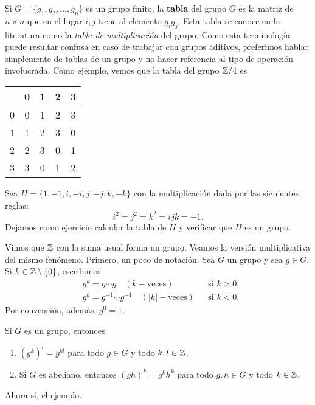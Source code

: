 Si $G=\{g_1,g_2,\dots,g_n\}$ es un grupo finito, la \textbf{tabla}  
del grupo $G$ es la matriz de $n\times n$ que en el lugar 
$i,j$ tiene al elemento $g_ig_j$. Esta tabla se conoce en la literatura como la \emph{tabla de multiplicación} del grupo. 
Como esta terminología puede resultar confusa en caso de trabajar con grupos aditivos, preferimos hablar simplemente
de tablas de un grupo y no hacer referencia al tipo de operación involucrada. Como ejemplo, 
vemos que la tabla del grupo
$\mathbb{Z}/4$ es
\begin{center}
  \begin{tabular}{l|cccc}
     &0&1&2&3 \\
    \hline
    0 & 0 & 1 & 2 & 3\\
    1 & 1 & 2 & 3 & 0\\
    2 & 2 & 3 & 0 & 1\\
    3 & 3 & 0 & 1 & 2
  \end{tabular}
\end{center}

\begin{example}
Sea $H=\{1,-1,i,-i,j,-j,k,-k\}$ con la multiplicación dada por las siguientes reglas:
\[
i^2=j^2=k^2=ijk=-1.
\]
Dejamos como ejercicio calcular la tabla de $H$ y verificar que $H$ es un grupo. 
\end{example}

Vimos que $\mathbb{Z}$ con la suma usual forma un grupo. 
Veamos la versión multiplicativa del mismo fenómeno.  
Primero, un poco de notación. 
Sea $G$ un grupo y sea $g\in G$. Si $k\in\mathbb{Z}\setminus\{0\}$, escribimos 
\begin{align*}
		& g^k=g\cdots g\quad (k-\text{veces}) && \text{si $k>0$},\\
		& g^k=g^{-1}\cdots g^{-1}\quad (|k|-\text{veces}) && \text{si $k<0$}.
\end{align*}
Por convención, además, $g^0=1$. 

\begin{exercise}
	Si $G$ es un grupo, entonces
	\begin{enumerate}
		\item $(g^k)^l=g^{kl}$ para todo $g\in G$ y todo $k,l\in\mathbb{Z}$. 
		\item Si $G$ es abeliano, entonces $(gh)^k=g^kh^k$ para todo $g,h\in G$
			y todo $k\in\mathbb{Z}$. 
	\end{enumerate}
\end{exercise}

Ahora sí, el ejemplo. 

